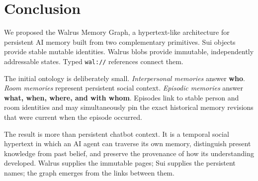 \documentclass[11pt]{article}
\begin{document}
\section{Conclusion}

We proposed the Walrus Memory Graph, a hypertext-like architecture for persistent AI memory built from two complementary primitives. Sui objects provide stable mutable identities. Walrus blobs provide immutable, independently addressable states. Typed \texttt{wal://} references connect them.

The initial ontology is deliberately small. \emph{Interpersonal memories} answer \textbf{who}. \emph{Room memories} represent persistent social context. \emph{Episodic memories} answer \textbf{what, when, where, and with whom}. Episodes link to stable person and room identities and may simultaneously pin the exact historical memory revisions that were current when the episode occurred.

The result is more than persistent chatbot context. It is a temporal social hypertext in which an AI agent can traverse its own memory, distinguish present knowledge from past belief, and preserve the provenance of how its understanding developed. Walrus supplies the immutable pages; Sui supplies the persistent names; the graph emerges from the links between them.
\end{document}
